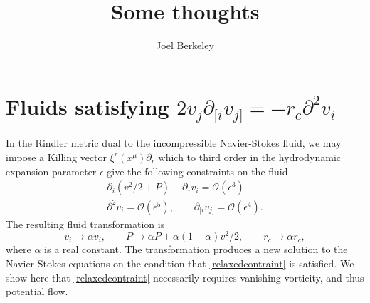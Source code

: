\documentclass[12pt,a4paper]{article}
\author{Joel Berkeley}
\title{Some thoughts}
\begin{document}
\maketitle

\section{Fluids satisfying $2v_j\partial_{[i}v_{j]}=-r_c\partial^2v_i$}

In the Rindler metric dual to the incompressible Navier-Stokes fluid, we may impose a Killing vector $\xi^r(x^\mu)\partial_r$ which to third order in the hydrodynamic expansion parameter $\epsilon$ give the following constraints on the fluid
\begin{gather}
\partial_i (v^2/2+P)+\partial_\tau v_i=\mathcal{O}(\epsilon^3)\label{relaxedcontraint}\\
\partial^2v_i=\mathcal{O}(\epsilon^5),\qquad \partial_{[i}v_{j]}=\mathcal{O}(\epsilon^4).
\end{gather}
The resulting fluid transformation is
\begin{equation}
v_i		\rightarrow		\alpha v_i,
\qquad
P		\rightarrow		\alpha P	+	\alpha \left( 1 - \alpha \right ) v^2/2,
\qquad
r_c	\rightarrow		\alpha r_c,
\label{scaling}
\end{equation}
where $\alpha$ is a real constant. The transformation produces a new solution to the Navier-Stokes equations on the condition that \eqref{relaxedcontraint} is satisfied. We show here that \eqref{relaxedcontraint} necessarily requires vanishing vorticity, and thus potential flow.
\end{document}
